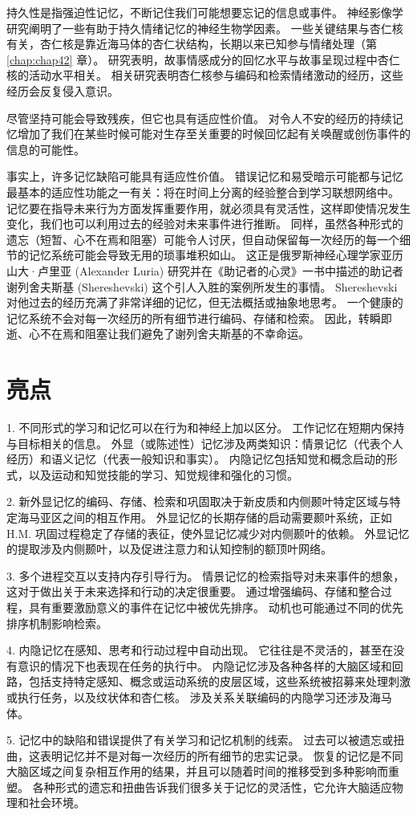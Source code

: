 持久性是指强迫性记忆，不断记住我们可能想要忘记的信息或事件。 神经影像学研究阐明了一些有助于持久情绪记忆的神经生物学因素。 一些关键结果与杏仁核有关，杏仁核是靠近海马体的杏仁状结构，长期以来已知参与情绪处理（第 \ref{chap:chap42} 章）。 研究表明，故事情感成分的回忆水平与故事呈现过程中杏仁核的活动水平相关。 相关研究表明杏仁核参与编码和检索情绪激动的经历，这些经历会反复侵入意识。

尽管坚持可能会导致残疾，但它也具有适应性价值。 对令人不安的经历的持续记忆增加了我们在某些时候可能对生存至关重要的时候回忆起有关唤醒或创伤事件的信息的可能性。

事实上，许多记忆缺陷可能具有适应性价值。 错误记忆和易受暗示可能都与记忆最基本的适应性功能之一有关：将在时间上分离的经验整合到学习联想网络中。 记忆要在指导未来行为方面发挥重要作用，就必须具有灵活性，这样即使情况发生变化，我们也可以利用过去的经验对未来事件进行推断。 同样，虽然各种形式的遗忘（短暂、心不在焉和阻塞）可能令人讨厌，但自动保留每一次经历的每一个细节的记忆系统可能会导致无用的琐事堆积如山。 这正是俄罗斯神经心理学家亚历山大·卢里亚 (Alexander Luria) 研究并在《助记者的心灵》一书中描述的助记者谢列舍夫斯基 (Shereshevski) 这个引人入胜的案例所发生的事情。 Shereshevski 对他过去的经历充满了非常详细的记忆，但无法概括或抽象地思考。 一个健康的记忆系统不会对每一次经历的所有细节进行编码、存储和检索。 因此，转瞬即逝、心不在焉和阻塞让我们避免了谢列舍夫斯基的不幸命运。


\section{亮点}

1. 不同形式的学习和记忆可以在行为和神经上加以区分。 工作记忆在短期内保持与目标相关的信息。 外显（或陈述性）记忆涉及两类知识：情景记忆（代表个人经历）和语义记忆（代表一般知识和事实）。 内隐记忆包括知觉和概念启动的形式，以及运动和知觉技能的学习、知觉规律和强化的习惯。 

2. 新外显记忆的编码、存储、检索和巩固取决于新皮质和内侧颞叶特定区域与特定海马亚区之间的相互作用。 外显记忆的长期存储的启动需要颞叶系统，正如 H.M. 巩固过程稳定了存储的表征，使外显记忆减少对内侧颞叶的依赖。 外显记忆的提取涉及内侧颞叶，以及促进注意力和认知控制的额顶叶网络。 

3. 多个进程交互以支持内存引导行为。 情景记忆的检索指导对未来事件的想象，这对于做出关于未来选择和行动的决定很重要。 通过增强编码、存储和整合过程，具有重要激励意义的事件在记忆中被优先排序。 动机也可能通过不同的优先排序机制影响检索。 

4. 内隐记忆在感知、思考和行动过程中自动出现。 它往往是不灵活的，甚至在没有意识的情况下也表现在任务的执行中。 内隐记忆涉及各种各样的大脑区域和回路，包括支持特定感知、概念或运动系统的皮层区域，这些系统被招募来处理刺激或执行任务，以及纹状体和杏仁核。 涉及关系关联编码的内隐学习还涉及海马体。 

5. 记忆中的缺陷和错误提供了有关学习和记忆机制的线索。 过去可以被遗忘或扭曲，这表明记忆并不是对每一次经历的所有细节的忠实记录。 恢复的记忆是不同大脑区域之间复杂相互作用的结果，并且可以随着时间的推移受到多种影响而重塑。 各种形式的遗忘和扭曲告诉我们很多关于记忆的灵活性，它允许大脑适应物理和社会环境。


